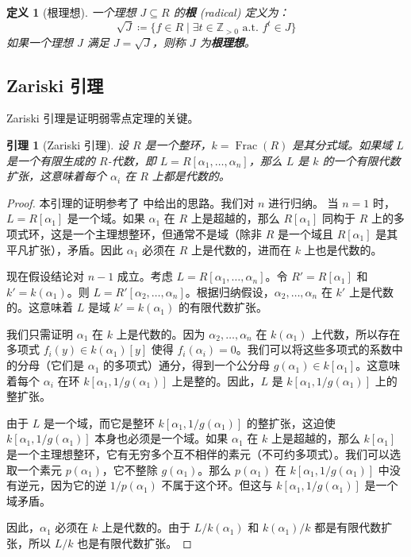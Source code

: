 \documentclass[UTF8]{ctexart}
\newtheorem{lemma}[theorem]{引理}
\newtheorem{definition}[theorem]{定义}
\DeclareMathOperator{\Frac}{Frac}
\begin{document}
\begin{definition}[根理想]
一个理想 $J \subseteq R$ 的\textbf{根} (radical) 定义为：
$$ \sqrt{J} \coloneqq \{ f \in R \mid \exists t \in \mathbb{Z}_{>0} \text{ a.t. } f^t \in J \} $$
如果一个理想 $J$ 满足 $J = \sqrt{J}$，则称 $J$ 为\textbf{根理想}。
\end{definition}

\subsection{Zariski 引理}

Zariski 引理是证明弱零点定理的关键。

\begin{lemma}[Zariski 引理]
设 $R$ 是一个整环，$k=\Frac(R)$ 是其分式域。如果域 $L$ 是一个有限生成的 $R$-代数，即 $L = R[\alpha_1, \dots, \alpha_n]$，那么 $L$ 是 $k$ 的一个有限代数扩张，这意味着每个 $\alpha_i$ 在 $R$ 上都是代数的。
\end{lemma}

\begin{proof}
本引理的证明参考了 \cite{azarang} 中给出的思路。我们对 $n$ 进行归纳。
当 $n=1$ 时，$L = R[\alpha_1]$ 是一个域。如果 $\alpha_1$ 在 $R$ 上是超越的，那么 $R[\alpha_1]$ 同构于 $R$ 上的多项式环，这是一个主理想整环，但通常不是域（除非 $R$ 是一个域且 $R[\alpha_1]$ 是其平凡扩张），矛盾。因此 $\alpha_1$ 必须在 $R$ 上是代数的，进而在 $k$ 上也是代数的。

现在假设结论对 $n-1$ 成立。考虑 $L = R[\alpha_1, \dots, \alpha_n]$。令 $R' = R[\alpha_1]$ 和 $k' = k(\alpha_1)$。则 $L = R'[\alpha_2, \dots, \alpha_n]$。根据归纳假设，$\alpha_2, \dots, \alpha_n$ 在 $k'$ 上是代数的。这意味着 $L$ 是域 $k' = k(\alpha_1)$ 的有限代数扩张。

我们只需证明 $\alpha_1$ 在 $k$ 上是代数的。因为 $\alpha_2, \dots, \alpha_n$ 在 $k(\alpha_1)$ 上代数，所以存在多项式 $f_i(y) \in k(\alpha_1)[y]$ 使得 $f_i(\alpha_i) = 0$。我们可以将这些多项式的系数中的分母（它们是 $\alpha_1$ 的多项式）通分，得到一个公分母 $g(\alpha_1) \in k[\alpha_1]$。这意味着每个 $\alpha_i$ 在环 $k[\alpha_1, 1/g(\alpha_1)]$ 上是整的。因此，$L$ 是 $k[\alpha_1, 1/g(\alpha_1)]$ 上的整扩张。

由于 $L$ 是一个域，而它是整环 $k[\alpha_1, 1/g(\alpha_1)]$ 的整扩张，这迫使 $k[\alpha_1, 1/g(\alpha_1)]$ 本身也必须是一个域。如果 $\alpha_1$ 在 $k$ 上是超越的，那么 $k[\alpha_1]$ 是一个主理想整环，它有无穷多个互不相伴的素元（不可约多项式）。我们可以选取一个素元 $p(\alpha_1)$，它不整除 $g(\alpha_1)$。那么 $p(\alpha_1)$ 在 $k[\alpha_1, 1/g(\alpha_1)]$ 中没有逆元，因为它的逆 $1/p(\alpha_1)$ 不属于这个环。但这与 $k[\alpha_1, 1/g(\alpha_1)]$ 是一个域矛盾。

因此，$\alpha_1$ 必须在 $k$ 上是代数的。由于 $L/k(\alpha_1)$ 和 $k(\alpha_1)/k$ 都是有限代数扩张，所以 $L/k$ 也是有限代数扩张。
\end{proof}
\end{document}
